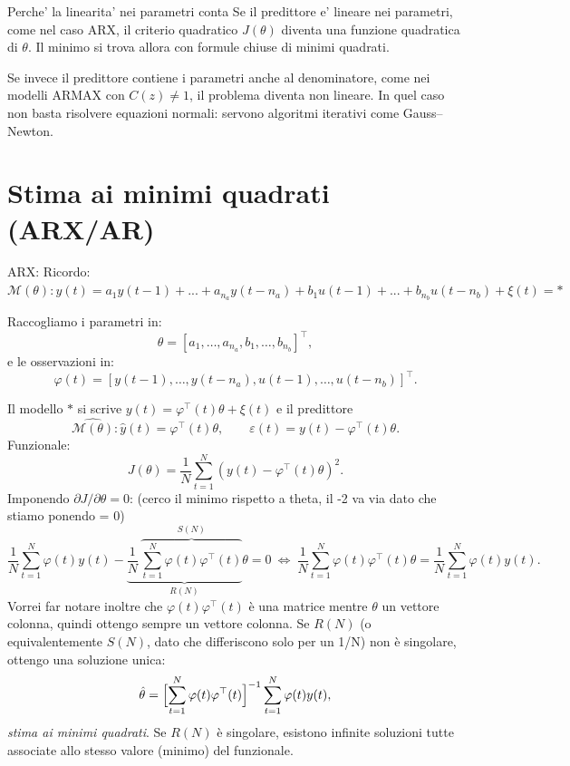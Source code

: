 \documentclass[11pt,a4paper]{article}
\begin{document}
\begin{spiegazione}{Perche' la linearita' nei parametri conta}
Se il predittore e' lineare nei parametri, come nel caso ARX, il criterio quadratico $J(\theta)$ diventa una funzione quadratica di $\theta$. Il minimo si trova allora con formule chiuse di minimi quadrati.

Se invece il predittore contiene i parametri anche al denominatore, come nei modelli ARMAX con $C(z)\neq 1$, il problema diventa non lineare. In quel caso non basta risolvere equazioni normali: servono algoritmi iterativi come Gauss--Newton.
\end{spiegazione}

\section{Stima ai minimi quadrati (ARX/AR)}
ARX:
Ricordo: $\mathcal{M(\theta)}: y(t) = a_1y(t-1)+...+a_{n_a}y(t-n_a)+b_1u(t-1)+...+b_{n_b}u(t-n_b)+\xi(t) = *$
\begin{center}
Raccogliamo i parametri in:
\[
\theta=[a_1,\dots,a_{n_a},b_1,\dots,b_{n_b}]^{\top},
\]
e le osservazioni in:
\[
\varphi(t)=[y(t-1),\dots,y(t-n_a),u(t-1),\dots,u(t-n_b)]^{\top}.
\]
\end{center}

Il modello $*$ si scrive $y(t)=\varphi^{\top}(t)\theta+\xi(t)$ e il predittore
\[
\hat{\mathcal{M(\theta)}}:\hat y(t)=\varphi^{\top}(t)\theta,\qquad \varepsilon(t)=y(t)-\varphi^{\top}(t)\theta.
\]
Funzionale:
\[
J(\theta)=\frac{1}{N}\sum_{t=1}^{N}(y(t)-\varphi^{\top}(t)\theta)^2.
\]
Imponendo $\partial J/\partial\theta=0$: (cerco il minimo rispetto a theta, il -2 va via dato che stiamo ponendo = 0)
\[
\frac{1}{N}\sum_{t=1}^{N}\varphi(t)y(t)
-
\underbrace{
\frac{1}{N}\,
\overbrace{\sum_{t=1}^{N}\varphi(t)\varphi^{\top}(t)}^{S(N)}
}_{R(N)}
\theta
=0
\ \Longleftrightarrow\
\frac{1}{N}\sum_{t=1}^{N}\varphi(t)\varphi^{\top}(t)\theta
=
\frac{1}{N}\sum_{t=1}^{N}\varphi(t)y(t).
\]
Vorrei far notare inoltre che $\varphi(t)\varphi^{\top}(t)$ è una matrice mentre $\theta$ un vettore colonna, quindi ottengo sempre un vettore colonna. 
Se $R(N)$ (o equivalentemente $S(N)$, dato che differiscono solo per un 1/N) non è singolare, ottengo una soluzione unica:
\[
\hat\theta=\Bigl[\sum_{t=1}^{N}\varphi(t)\varphi^{\top}(t)\Bigr]^{-1}\sum_{t=1}^{N}\varphi(t)y(t),
\]
\emph{stima ai minimi quadrati}. Se $R(N)$ è singolare, esistono infinite soluzioni tutte associate allo stesso valore (minimo) del funzionale.
\end{document}
